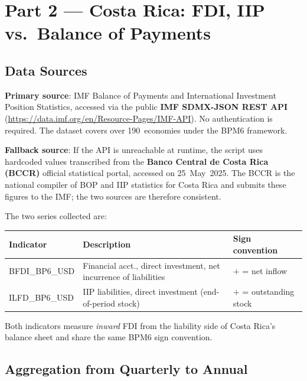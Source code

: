 \documentclass[11pt, a4paper]{article}
\begin{document}
\section{Part 2 — Costa Rica: FDI, IIP vs.\ Balance of Payments}

\subsection{Data Sources}

\textbf{Primary source}: IMF Balance of Payments and International
Investment Position Statistics, accessed via the public
\textbf{IMF SDMX-JSON REST API}
(\url{https://data.imf.org/en/Resource-Pages/IMF-API}).
No authentication is required. The dataset covers over 190~economies
under the BPM6 framework.

\textbf{Fallback source}: If the API is unreachable at runtime, the
script uses hardcoded values transcribed from the
\textbf{Banco Central de Costa Rica (BCCR)} official statistical portal,
accessed on 25~May~2025. The BCCR is
the national compiler of BOP and IIP statistics for Costa Rica and
submits these figures to the IMF; the two sources are therefore
consistent.

The two series collected are:

\begin{center}
\begin{tabular}{>{\ttfamily}l l l}
    \toprule
    \normalfont\textbf{Indicator} & \textbf{Description} & \textbf{Sign convention} \\
    \midrule
    BFDI\_BP6\_USD & Financial acct., direct investment,
                     net incurrence of liabilities & $+$ = net inflow \\
    ILFD\_BP6\_USD & IIP liabilities, direct investment
                     (end-of-period stock)         & $+$ = outstanding stock \\
    \bottomrule
\end{tabular}
\end{center}

Both indicators measure \emph{inward} FDI from the liability side of
Costa Rica's balance sheet and share the same BPM6 sign convention.

\subsection{Aggregation from Quarterly to Annual}
\end{document}
